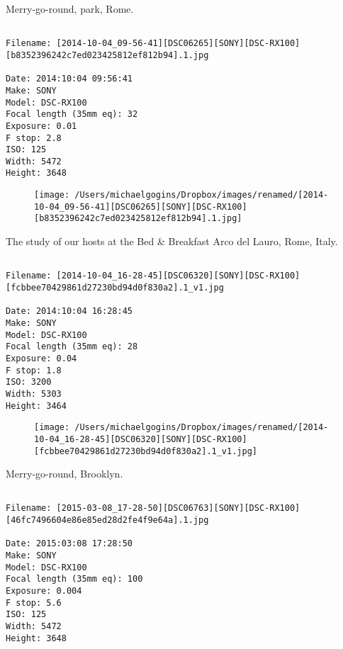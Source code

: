 \documentclass[11pt,letter,DIV=14,paper=landscape]{scrbook}
\begin{document}
\clearpage
\noindent Merry-go-round, park, Rome.
\noindent
\begin{lstlisting}

Filename: [2014-10-04_09-56-41][DSC06265][SONY][DSC-RX100][b8352396242c7ed023425812ef812b94].1.jpg

Date: 2014:10:04 09:56:41
Make: SONY
Model: DSC-RX100
Focal length (35mm eq): 32
Exposure: 0.01
F stop: 2.8
ISO: 125
Width: 5472
Height: 3648
\end{lstlisting}
\clearpage

\begin{figure}
\texttt{[image: /Users/michaelgogins/Dropbox/images/renamed/[2014-10-04\_09-56-41][DSC06265][SONY][DSC-RX100][b8352396242c7ed023425812ef812b94].1.jpg]}
\end{figure}
    
\clearpage
\noindent The study of our hosts at the Bed & Breakfast Arco del Lauro, Rome, Italy.
\noindent
\begin{lstlisting}

Filename: [2014-10-04_16-28-45][DSC06320][SONY][DSC-RX100][fcbbee70429861d27230bd94d0f830a2].1_v1.jpg

Date: 2014:10:04 16:28:45
Make: SONY
Model: DSC-RX100
Focal length (35mm eq): 28
Exposure: 0.04
F stop: 1.8
ISO: 3200
Width: 5303
Height: 3464
\end{lstlisting}
\clearpage

\begin{figure}
\texttt{[image: /Users/michaelgogins/Dropbox/images/renamed/[2014-10-04\_16-28-45][DSC06320][SONY][DSC-RX100][fcbbee70429861d27230bd94d0f830a2].1\_v1.jpg]}
\end{figure}
    
\clearpage
\noindent Merry-go-round, Brooklyn.
\noindent
\begin{lstlisting}

Filename: [2015-03-08_17-28-50][DSC06763][SONY][DSC-RX100][46fc7496604e86e85ed28d2fe4f9e64a].1.jpg

Date: 2015:03:08 17:28:50
Make: SONY
Model: DSC-RX100
Focal length (35mm eq): 100
Exposure: 0.004
F stop: 5.6
ISO: 125
Width: 5472
Height: 3648
\end{lstlisting}
\clearpage
\end{document}
